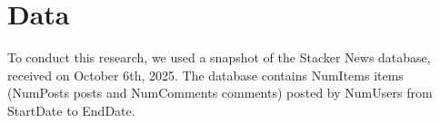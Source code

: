 \section{Data} \label{sec_data}

To conduct this research, we used a snapshot of the Stacker News database, received on October 6th, 2025. The database contains NumItems items (NumPosts posts and NumComments comments) posted by NumUsers from StartDate to EndDate. 